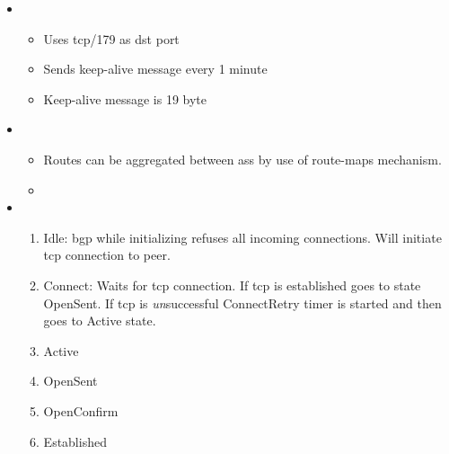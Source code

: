 \begin{itemize}
    \item {}
    \begin{itemize}
        \item Uses tcp/179 as \gls{dst} port
        \item Sends keep-alive message every 1 minute
        \item Keep-alive message is 19 byte
    \end{itemize}
    \item {}
    \begin{itemize}
        \item Routes can be aggregated between \Glspl{as} by use of route-maps mechanism.
        \item 
    \end{itemize}
    \item {}
    \begin{enumerate}
        \item Idle: \Gls{bgp} while initializing refuses all incoming connections. Will initiate \Gls{tcp} connection to peer.
        \item Connect: Waits for \Gls{tcp} connection. If \Gls{tcp} is established goes to state OpenSent. If \Gls{tcp} is \textit{un}successful ConnectRetry timer is started and then goes to Active state.
        \item Active
        \item OpenSent
        \item OpenConfirm
        \item Established
    \end{enumerate}
\end{itemize}